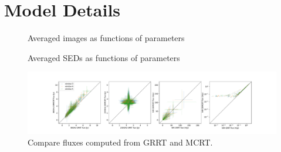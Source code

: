 \section{Model Details}\label{app:models}

\begin{figure}
  \centering
  \caption{Averaged images as functions of parameters}
  \label{fig:imgs}
\end{figure}

\begin{figure}
  \centering
  \caption{Averaged SEDs as functions of parameters}
  \label{fig:seds}
\end{figure}

\begin{figure}
  \centering
  \includegraphics[width=\textwidth]{figures/GRRT_vs_MCRT.pdf}
  \caption{Compare fluxes computed from GRRT and MCRT.}
  \label{fig:GRRT_vs_MCRT}
\end{figure}
